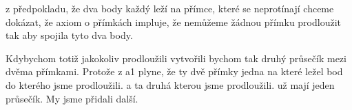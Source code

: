 \documentclass{article}
\begin{document}
z předpokladu, že dva body každý leží na přímce, které se neprotínají chceme
dokázat, že axiom o přímkách impluje, že nemůžeme žádnou přímku prodloužit tak
aby spojila tyto dva body. 

Kdybychom totiž jakokoliv prodloužili vytvořili bychom tak druhý průsečík mezi
dvěma přímkami. Protože z a1 plyne, že ty dvě přímky jedna na které ležel bod do
kterého jsme prodloužili. a ta druhá kterou jsme prodloužili. už mají jeden
průsečík. My jsme přidali další.
\end{document}

